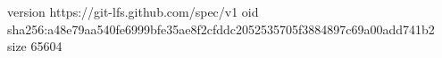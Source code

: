 version https://git-lfs.github.com/spec/v1
oid sha256:a48e79aa540fe6999bfe35ae8f2cfddc2052535705f3884897c69a00add741b2
size 65604
